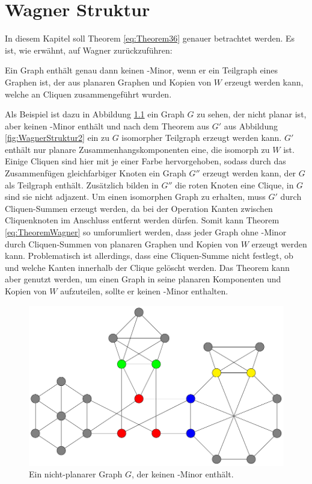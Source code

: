 \chapter{Wagner Struktur}
\label{cha:wagnerstruktur}

In diesem Kapitel soll Theorem \ref{eq:Theorem36} genauer betrachtet werden.
Es ist, wie erwähnt, auf Wagner zurückzuführen:
\begin{theorem}\label{eq:TheoremWagner}
  Ein Graph enthält genau dann keinen \kf-Minor, wenn er ein Teilgraph eines Graphen ist, der aus planaren Graphen und Kopien von $W$ erzeugt werden kann, welche an Cliquen zusammengeführt wurden.\cite{Wag37}
\end{theorem}
Als Beispiel ist dazu in Abbildung \ref{fig:WagnerStruktur1} ein Graph $G$ zu sehen, der nicht planar ist, aber keinen \kf-Minor enthält und nach dem Theorem aus $G'$ aus Abbildung \ref{fig:WagnerStruktur2} ein zu $G$ isomorpher Teilgraph erzeugt werden kann.
$G'$ enthält nur planare Zusammenhangskomponenten \bzw eine, die isomorph zu $W$ ist.
Einige Cliquen sind hier mit je einer Farbe hervorgehoben, sodass durch das Zusammenfügen gleichfarbiger Knoten ein Graph $G''$ erzeugt werden kann, der $G$ als Teilgraph enthält.
Zusätzlich bilden in $G''$ die roten Knoten eine Clique, in $G$ sind sie nicht adjazent.
Um einen isomorphen Graph zu erhalten, muss $G'$ durch Cliquen-Summen erzeugt werden, da bei der Operation Kanten zwischen Cliquenknoten im Anschluss entfernt werden dürfen.
Somit kann Theorem \ref{eq:TheoremWagner} so umforumliert werden, dass jeder Graph ohne \kf-Minor durch Cliquen-Summen von planaren Graphen und Kopien von $W$ erzeugt werden kann.
Problematisch ist allerdings, dass eine Cliquen-Summe nicht festlegt, ob und welche Kanten innerhalb der Clique gelöscht werden.
Das Theorem kann aber genutzt werden, um einen Graph in seine planaren Komponenten und Kopien von $W$ aufzuteilen, sollte er keinen \kf-Minor enthalten.

\begin{figure}[H]
  \centering
  \includegraphics[width=\textwidth,height=\textheight,keepaspectratio]{bilder/WagnerTheorem1.pdf}
  \caption{Ein nicht-planarer Graph $G$, der keinen \kf-Minor enthält.}
  \label{fig:WagnerStruktur1}
\end{figure}

